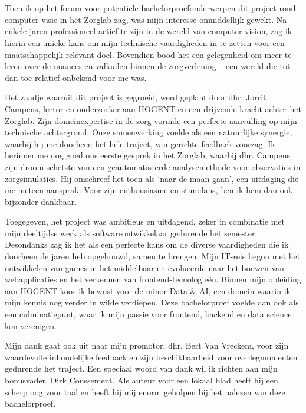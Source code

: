 
\chapter*{}%
\label{ch:voorwoord}

Toen ik op het forum voor potentiële bachelorproefonderwerpen dit project rond computer visie in het Zorglab zag, was mijn interesse onmiddellijk gewekt. 
Na enkele jaren professioneel actief te zijn in de wereld van computer vision, zag ik hierin een unieke kans om 
mijn technische vaardigheden in te zetten voor een maatschappelijk relevant doel.
Bovendien bood het een gelegenheid om meer te leren over de nuances en valkuilen binnen de zorgverlening – een wereld die tot dan toe relatief onbekend voor me was.

Het zaadje waaruit dit project is gegroeid, werd geplant door dhr. Jorrit Campens, lector en onderzoeker aan HOGENT en een drijvende kracht achter het Zorglab.
Zijn domeinexpertise in de zorg vormde een perfecte aanvulling op mijn technische achtergrond. 
Onze samenwerking voelde als een natuurlijke synergie, waarbij hij me doorheen het hele traject, van gerichte feedback voorzag.
Ik herinner me nog goed ons eerste gesprek in het Zorglab, waarbij dhr. Campens zijn droom schetste van een geautomatiseerde analysemethode voor observaties in zorgsimulaties.
Hij omschreef het toen als `naar de maan gaan', een uitdaging die me meteen aansprak. Voor zijn enthousiasme en stimulans, ben ik hem dan ook bijzonder dankbaar.

Toegegeven, het project was ambitieus en uitdagend, zeker in combinatie met mijn deeltijdse werk als softwareontwikkelaar gedurende het semester.
Desondanks zag ik het als een perfecte kans om de diverse vaardigheden die ik doorheen de jaren heb opgebouwd, samen te brengen.
Mijn IT-reis begon met het ontwikkelen van games in het middelbaar en evolueerde naar het bouwen van webapplicaties en het verkennen van frontend-tecnologieën.
Binnen mijn opleiding aan HOGENT koos ik bewust voor de minor Data \& AI, een domein waarin ik mijn kennis nog verder in wilde verdiepen.
Deze bachelorproef voelde dan ook als een culminatiepunt, waar ik mijn passie voor frontend, backend en data science kon verenigen.

Mijn dank gaat ook uit naar mijn promotor, dhr. Bert Van Vreckem, voor zijn waardevolle inhoudelijke feedback en zijn beschikbaarheid voor overlegmomenten gedurende het traject.
Een speciaal woord van dank wil ik richten aan mijn bonusvader, Dirk Coussement.
Als auteur voor een lokaal blad heeft hij een scherp oog voor taal en heeft hij mij enorm geholpen bij het nalezen van deze bachelorproef.

